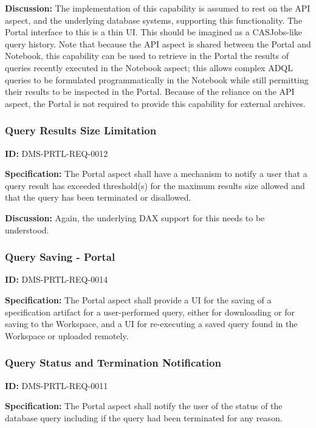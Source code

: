 \documentclass[SE,toc,lsstdraft]{lsstdoc}
\begin{document}
\textbf{Discussion:}
The implementation of this capability is assumed to rest on the API aspect, and the underlying database systems, supporting this functionality. The Portal interface to this is a thin UI.  This should be imagined as a CASJobs-like query history.
Note that because the API aspect is shared between the Portal and Notebook, this capability can be used to retrieve in the Portal the results of queries recently executed in the Notebook aspect; this allows complex ADQL queries to be formulated programmatically in the Notebook while still permitting their results to be inspected in the Portal.
Because of the reliance on the API aspect, the Portal is not required to provide this capability for external archives.

\subsubsection{Query Results Size Limitation}

\label{DMS-PRTL-REQ-0012}
\textbf{ID:} DMS-PRTL-REQ-0012

\textbf{Specification:}
The Portal aspect shall have a mechanism to notify a user that a query result has exceeded threshold(s) for the maximum results size allowed and that the query has been terminated or disallowed.

\textbf{Discussion:}
Again, the underlying DAX support for this needs to be understood.

\subsubsection{Query Saving - Portal}

\label{DMS-PRTL-REQ-0014}
\textbf{ID:} DMS-PRTL-REQ-0014

\textbf{Specification:}
The Portal aspect shall provide a UI for the saving of a specification artifact for a user-performed query, either for downloading or for saving to the Workspace, and a UI for re-executing a saved query found in the Workspace or uploaded remotely.

\subsubsection{Query Status and Termination Notification}

\label{DMS-PRTL-REQ-0011}
\textbf{ID:} DMS-PRTL-REQ-0011

\textbf{Specification:}
The Portal aspect shall notify the user of the status of the database query including if the query had been terminated for any reason.
\end{document}
